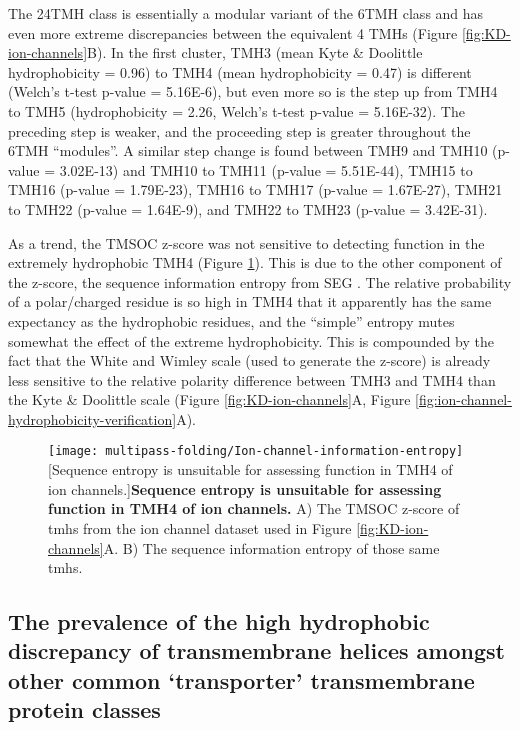 The 24TMH class is essentially a modular variant of the 6TMH class and has even more extreme discrepancies between the equivalent 4 TMHs (Figure \ref{fig:KD-ion-channels}B).
In the first cluster, TMH3 (mean Kyte \& Doolittle hydrophobicity = 0.96) to TMH4 (mean hydrophobicity = 0.47) is different (Welch's t\--test p\--value = 5.16E-6), but even more so is the step up from TMH4 to TMH5 (hydrophobicity = 2.26, Welch's t\--test p\--value = 5.16E-32).
The preceding step is weaker, and the proceeding step is greater throughout the 6TMH ``modules''.
A similar step change is found between TMH9 and TMH10 (p\--value = 3.02E-13) and TMH10 to TMH11 (p\--value = 5.51E-44), TMH15 to TMH16 (p\--value = 1.79E-23), TMH16 to TMH17 (p\--value = 1.67E-27), TMH21 to TMH22 (p\--value = 1.64E-9), and TMH22 to TMH23 (p\--value = 3.42E-31).

As a trend, the TMSOC  z\--score was not sensitive to detecting function in the extremely hydrophobic TMH4 (Figure \ref{fig:Ion-channel-information-entropy}).
This is due to the other component of the  z\--score, the sequence information entropy from SEG \cite{Wootton1996, WOOTTON1994269, Wong2011, Wong2012}.
The relative probability of a polar/charged residue is so high in TMH4 that it apparently has the same expectancy as the hydrophobic residues, and the ``simple'' entropy mutes somewhat the effect of the extreme hydrophobicity.
This is compounded by the fact that the White and Wimley scale (used to generate the  z\--score) is already less sensitive to the relative polarity difference between TMH3 and TMH4 than the Kyte \& Doolittle scale (Figure \ref{fig:KD-ion-channels}A, Figure \ref{fig:ion-channel-hydrophobicity-verification}A).

\begin{figure}[!ht]
\centering
\texttt{[image: multipass-folding/Ion-channel-information-entropy]}
		[Sequence entropy is unsuitable for assessing function in TMH4 of ion channels.]{\textbf{Sequence entropy is unsuitable for assessing function in TMH4 of ion channels.}
    A) The TMSOC  z\--score \cite{Wong2011, Wong2012} of \gls{tmh}s from the ion channel dataset used in Figure \ref{fig:KD-ion-channels}A.
    B) The sequence information entropy of those same \gls{tmh}s.
    }

\label{fig:Ion-channel-information-entropy}
\end{figure}


\subsection{The prevalence of the high hydrophobic discrepancy of transmembrane helices amongst other common `transporter' transmembrane protein classes}

